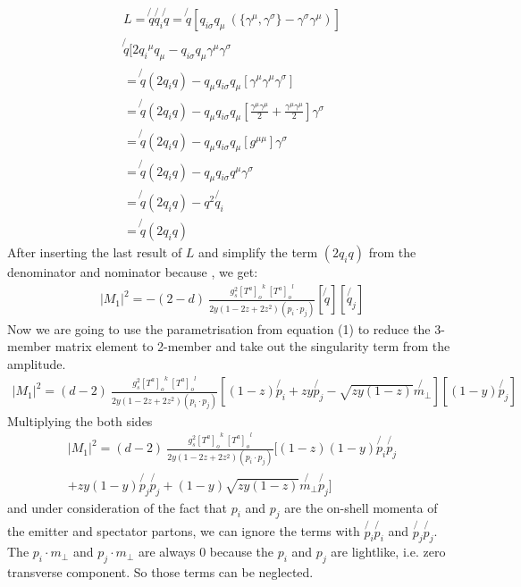 \begin{equation}
\begin{split}
L=\not{q} \not{q_i} \not{q} =\not{q}[{q_{i\sigma}} q_{\mu} \: (\lbrace{\gamma^{\mu}}, {\gamma^{\sigma}}\rbrace - {\gamma^{\sigma}}{\gamma^{\mu}})]\\ 
\not{q}[2{q_{i}}^{\mu} q_{\mu} - {q_{i\sigma}}q_{\mu}{\gamma^{\mu}}{\gamma^{\sigma}}\\
=\not{q} (2q_i q)-q_{\mu}{q_{i\sigma}}q_{\mu}[{\gamma^{\mu}}{\gamma^{\mu}}{\gamma^{\sigma}}]\\
=\not{q} (2q_i q)-q_{\mu}{q_{i\sigma}}q_{\mu}[\frac{{\gamma^{\mu}}{\gamma^{\mu}}}{2} +\frac{{\gamma^{\mu}}{\gamma^{\mu}}}{2}]{\gamma^{\sigma}}\\
=\not{q} (2q_i q)-q_{\mu}{q_{i\sigma}}q_{\mu}[g^{{\mu}{\mu}}]{\gamma^{\sigma}}\\
=\not{q} (2q_i q)-q_{\mu}{q_{i\sigma}}q^{\mu}{\gamma^{\sigma}}\\
=\not{q} (2q_i q)-q^2 \not{q_i}\\
=\not{q} (2q_i q)
\end{split}
\end{equation}
After inserting the last result of $ L $ and simplify the term $ (2q_i q) $ from the denominator and nominator because , we get:
\begin{equation}
\begin{split}
|M_1|^2=-(2-d)\:\frac{g_s^2  {[T^a]_{o}}^k \: {[T^a]_o}^l }{2y(1-2z+2z^2)(p_i \cdot p_j)}
[\not{q}]
[\not{q_j}]
\end{split}
\end{equation}
Now we are going to use the parametrisation from equation (1) to reduce the 3-member matrix element to 2-member and take out the singularity term from the amplitude.
\begin{equation}
\begin{split}
|M_1|^2=(d-2)\:\frac{g_s^2  {[T^a]_{o}}^k \: {[T^a]_o}^l }{2y(1-2z+2z^2)(p_i \cdot p_j)}
[(1-z) \not{p_i}+zy \not{p_j} - \sqrt{zy(1-z)} \not{{m}_{\bot}}]
[(1-y) \not{p_j}]
\end{split}
\end{equation}
Multiplying the both sides 
\begin{equation}
\begin{split}
|M_1|^2=(d-2)\:\frac{g_s^2  {[T^a]_{o}}^k \: {[T^a]_o}^l }{2y(1-2z+2z^2)(p_i \cdot p_j)}
[(1-z)(1-y) \not{p_i}\not{p_j} \\
+zy(1-y) \not{p_j}\not{p_j} + (1-y)\sqrt{zy(1-z)} \not{{m}_{\bot}}\not{p_j}]
\end{split}
\end{equation}
and under consideration of the fact that $ p_i $ and $ p_j $ are the on-shell momenta of the emitter and spectator partons, we can ignore the terms with $ \not{p_i} \not{p_i} $ and $ \not{p_j} \not{p_j} $.
The $ {p_i} \cdot  {m}_{\bot} $ and $ {p_j} \cdot  {m}_{\bot} $ are always $ 0 $ because the $ p_i $ and $ p_j $ are lightlike, i.e. zero transverse component. So those terms can be neglected.


